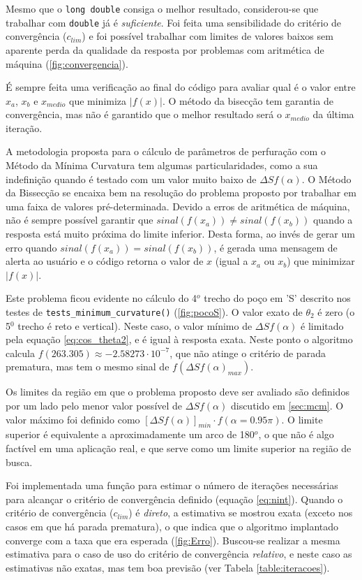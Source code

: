 \documentclass[final,3p,12pt]{elsarticle}
\begin{document}
    Mesmo que o \verb|long double| consiga o melhor resultado, considerou-se que trabalhar com \verb|double| já é \emph{suficiente}. Foi feita uma sensibilidade do critério de convergência ($c_{lim}$) e foi possível trabalhar com limites de valores baixos sem aparente perda da qualidade da resposta por problemas com aritmética de máquina (\ref{fig:convergencia}).

    É sempre feita uma verificação ao final do código para avaliar qual é o valor entre $x_a$, $x_b$ e $x_{medio}$ que minimiza $|f(x)|$. O método da bisecção tem garantia de convergência, mas não é garantido que o melhor resultado será o $x_{medio}$ da última iteração.
    
    A metodologia proposta para o cálculo de parâmetros de perfuração com o Método da Mínima Curvatura tem algumas particularidades, como a sua indefinição quando é testado com um valor muito baixo de $\Delta S f(\alpha)$. O Método da Bissecção se encaixa bem na resolução do problema proposto por trabalhar em uma faixa de valores pré-determinada. Devido a erros de aritmética de máquina, não é sempre possível garantir que $sinal(f(x_a)) \neq sinal(f(x_b))$ quando a resposta está muito próxima do limite inferior. Desta forma, ao invés de gerar um erro quando $sinal(f(x_a)) = sinal(f(x_b))$, é gerada uma mensagem de alerta ao usuário e o código retorna o valor de $x$ (igual a $x_a$ ou $x_b$) que minimizar $|f(x)|$.
    
    Este problema ficou evidente no cálculo do 4$^o$ trecho do poço em 'S' descrito nos testes de \verb|tests_minimum_curvature()| (\ref{fig:pocoS}). O valor exato de $\theta_2$ é zero (o 5$^0$ trecho é reto e vertical). Neste caso, o valor mínimo de $\Delta S f(\alpha)$ é limitado pela equação \ref{eq:cos_theta2}, e é igual à resposta exata. Neste ponto o algoritmo calcula $f(263.305) \approx -2.58273 \cdot 10^{-7}$, que não atinge o critério de parada prematura, mas tem o mesmo sinal de $f(\Delta S f(\alpha)_{max})$.

    Os limites da região em que o problema proposto deve ser avaliado são definidos por um lado pelo menor valor possível de $\Delta S f(\alpha)$ discutido em \ref{sec:mcm}. O valor máximo foi definido como $[\Delta S f(\alpha)]_{min} \cdot f(\alpha = 0.95\pi)$. O limite superior é equivalente a aproximadamente um arco de 180$^o$, o que não é algo factível em uma aplicação real, e que serve como um limite superior na região de busca.

    Foi implementada uma função para estimar o número de iterações necessárias para alcançar o critério de convergência definido (equação \ref{eq:nint}). Quando o critério de convergência ($c_{lim}$) é \emph{direto}, a estimativa se mostrou exata (exceto nos casos em que há parada prematura), o que indica que o algoritmo implantado converge com a taxa que era esperada (\ref{fig:Erro}). Buscou-se realizar a mesma estimativa para o caso de uso do critério de convergência \emph{relativo}, e neste caso as estimativas não exatas, mas tem boa previsão (ver Tabela \ref{table:iteracoes}).
    
\end{document}
